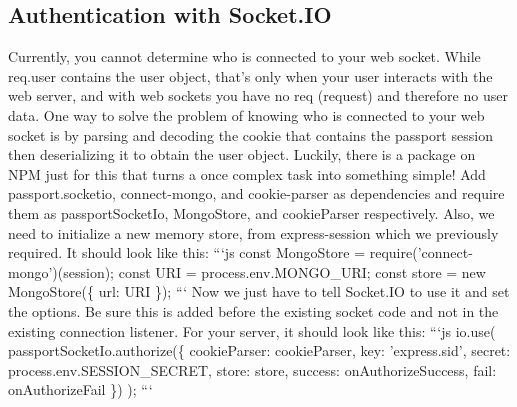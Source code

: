 \documentclass{article}%
\begin{document}
\subsection{Authentication with Socket.IO}%
\label{subsec:AuthenticationwithSocket.IO}%
Currently, you cannot determine who is connected to your web socket. While req.user contains the user object, that's only when your user interacts with the web server, and with web sockets you have no req (request) and therefore no user data. One way to solve the problem of knowing who is connected to your web socket is by parsing and decoding the cookie that contains the passport session then deserializing it to obtain the user object. Luckily, there is a package on NPM just for this that turns a once complex task into something simple!\newline%
Add passport.socketio, connect{-}mongo, and cookie{-}parser as dependencies and require them as passportSocketIo, MongoStore, and cookieParser respectively. Also, we need to initialize a new memory store, from express{-}session which we previously required. It should look like this:\newline%
```js\newline%
const MongoStore = require('connect{-}mongo')(session);\newline%
const URI = process.env.MONGO\_URI;\newline%
const store = new MongoStore(\{ url: URI \});\newline%
```\newline%
Now we just have to tell Socket.IO to use it and set the options. Be sure this is added before the existing socket code and not in the existing connection listener. For your server, it should look like this:\newline%
```js\newline%
io.use(\newline%
  passportSocketIo.authorize(\{\newline%
    cookieParser: cookieParser,\newline%
    key: 'express.sid',\newline%
    secret: process.env.SESSION\_SECRET,\newline%
    store: store,\newline%
    success: onAuthorizeSuccess,\newline%
    fail: onAuthorizeFail\newline%
  \})\newline%
);\newline%
```\newline%
\end{document}
